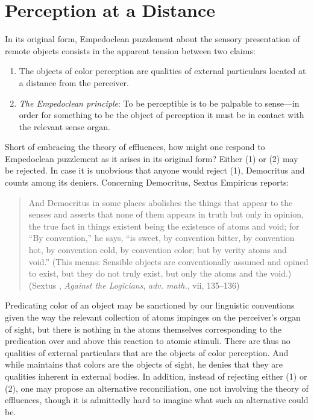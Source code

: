 \chapter{Perception at a Distance} %
\label{cha:perception_at_a_distance}

In its original form, Empedoclean puzzlement about the sensory presentation of remote objects consists in the apparent tension between two claims:
\begin{enumerate}[(1)]
    \item The objects of color perception are qualities of external particulars located at a distance from the perceiver.
    \item \emph{The Empedoclean principle}: To be perceptible is to be palpable to sense---in order for something to be the object of perception it must be in contact with the relevant sense organ.
\end{enumerate}
Short of embracing the theory of effluences, how might one respond to Empedoclean puzzlement as it arises in its original form? Either (1) or (2) may be rejected. In case it is unobvious that anyone would reject (1), Democritus and \citet{Berkeley:1734fk} counts among its deniers. Concerning Democritus, Sextus Empiricus reports:
\begin{quote}
	And Democritus in some places abolishes the things that appear to the senses and asserts that none of them appears in truth but only in opinion, the true fact in things existent being the existence of atoms and void; for ``By convention,'' he says, ``is sweet, by convention bitter, by convention hot, by convention cold, by convention color; but by verity atoms and void.'' (This means: Sensible objects are conventionally assumed and opined to exist, but they do not truly exist, but only the atoms and the void.) (Sextus \citeauthor{Empiricus:1997kx}, \emph{Against the Logicians}, \emph{adv. math.}, vii, 135--136) 
\end{quote}
Predicating color of an object may be sanctioned by our linguistic conventions given the way the relevant collection of atoms impinges on the perceiver's organ of sight, but there is nothing in the atoms themselves corresponding to the predication over and above this reaction to atomic stimuli. There are thus no qualities of external particulars that are the objects of color perception. And while \citet{Berkeley:1734fk} maintains that colors are the objects of sight, he denies that they are qualities inherent in external bodies. In addition, instead of rejecting either (1) or (2), one may propose an alternative reconciliation, one not involving the theory of effluences, though it is admittedly hard to imagine what such an alternative could be.

